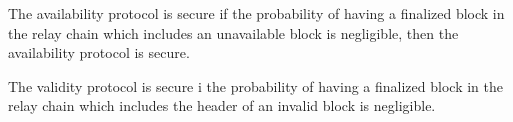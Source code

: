 \begin{definition} The availability protocol is secure if the probability of having a finalized block in the relay chain which includes an unavailable block is negligible, then the availability protocol is secure.
\end{definition}

\begin{definition}
The validity protocol is secure i the probability of having a finalized block in the relay chain which includes the header of an invalid block is negligible.
\end{definition}






